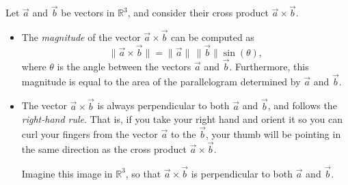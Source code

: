 \documentclass{ximera}
\begin{document}
\begin{proposition}
Let $\vec{a}$ and $\vec{b}$ be vectors in $\mathbb{R}^3$, and consider their cross product $\vec{a}\times\vec{b}$.
\begin{itemize}
\item The \emph{magnitude} of the vector $\vec{a}\times\vec{b}$ can be computed as 
\[
\|\vec{a}\times\vec{b}\| = \|\vec{a}\|\,\|\vec{b}\|\sin(\theta),
\]
where $\theta$ is the angle between the vectors $\vec{a}$ and $\vec{b}$. Furthermore, this magnitude is equal to the area of the parallelogram determined by $\vec{a}$ and $\vec{b}$.

\begin{image}
\end{image}

\item The vector $\vec{a}\times\vec{b}$ is always perpendicular to both $\vec{a}$ and $\vec{b}$, and follows the \emph{right-hand rule}. That is, if you take your right hand and orient it so you can curl your fingers from the vector $\vec{a}$ to the $\vec{b}$, your thumb will be pointing in the same direction as the cross product $\vec{a}\times\vec{b}$.

\begin{image}
\end{image}

Imagine this image in $\mathbb{R}^3$, so that $\vec{a}\times\vec{b}$ is perpendicular to both $\vec{a}$ and $\vec{b}$.

\end{itemize}
\end{proposition}
\end{document}
